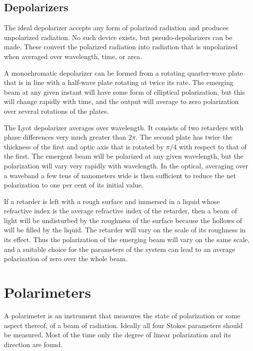 \subsection{Depolarizers}

The ideal depolarizer accepts any form of polarized radiation and produces unpolarized
radiation. No such device exists, but pseudo-depolarizers can be made. These convert the polarized radiation into radiation that is unpolarized when averaged over wavelength, time, or area. 

A monochromatic depolarizer can be formed from a rotating quarter-wave plate that is in
line with a half-wave plate rotating at twice its rate. The emerging beam at any given instant will have some form of elliptical polarization, but this will change rapidly with time, and the output will average to zero polarization over several rotations of the plates. 

The Lyot depolarizer averages over wavelength. It consists of two retarders with phase differences very much greater than $2\pi$. The second plate has twice the thickness of the first and optic axis that is rotated by $\pi/4$ with respect to that of the first. The emergent beam will be polarized at any given wavelength, but the polarization will vary very rapidly with wavelength. In the optical, averaging over a waveband a few tens of nanometers wide is then sufficient to reduce the net polarization to one per cent of its initial value. 

If a retarder is left with a rough surface and immersed in a liquid whose refractive index is the average refractive index of the retarder, then a beam of light will be undisturbed by the roughness of the surface because the hollows of will be filled by the liquid. The retarder will vary on the scale of its roughness in its effect. Thus the polarization of the emerging beam will vary on the same scale, and a suitable choice for the parameters of the system can lead to an average polarization of zero over the whole beam.

\section{Polarimeters}
A polarimeter is an instrument that measures the state of polarization or some aspect thereof, of a beam of radiation. Ideally all four Stokes parameters should be measured. Most of the time only the degree of linear polarization and its direction are found.

